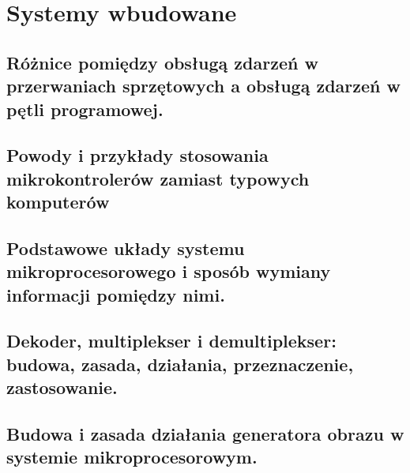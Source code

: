 \chapter{Systemy wbudowane}
\section{Różnice pomiędzy obsługą zdarzeń w przerwaniach sprzętowych a obsługą zdarzeń w pętli programowej. }
\section{Powody i przykłady stosowania mikrokontrolerów zamiast typowych komputerów}
\section{Podstawowe układy systemu mikroprocesorowego i sposób wymiany informacji pomiędzy nimi.}
\section{Dekoder, multiplekser i demultiplekser: budowa, zasada, działania, przeznaczenie, zastosowanie.}
\section{Budowa i zasada działania generatora obrazu w systemie mikroprocesorowym.}